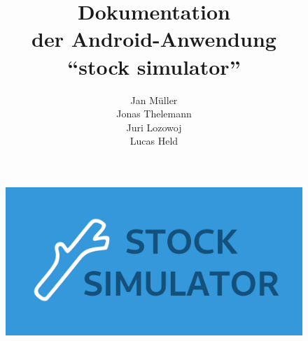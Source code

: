 \documentclass[a4paper]{article}
\begin{document}
\title{\textbf{Dokumentation\\der Android-Anwendung\\"`stock simulator"'}}

\author{
    Jan Müller\\
    Jonas Thelemann\\
    Juri Lozowoj\\
    Lucas Held
}
\maketitle

\begin{figure}[H]
    \centering
    \includegraphics[width=\textwidth,keepaspectratio]{./images/stock-simulator-social.png}
\end{figure}

\pagebreak
\tableofcontents
\pagebreak
\end{document}
